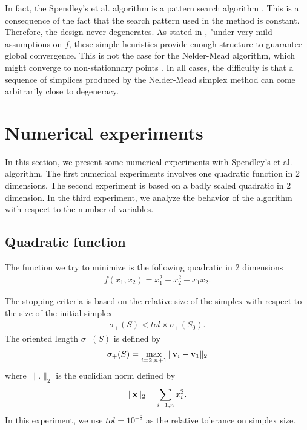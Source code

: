 In fact, the Spendley's et al. algorithm is a pattern search 
algorithm \cite{Torczon98fromevolutionary}. This is a consequence 
of the fact that the search pattern used in the method is constant.
Therefore, the design never degenerates. 
As stated in \cite{Torczon98fromevolutionary}, "under very mild 
assumptions on $f$, these simple heuristics 
provide enough structure to guarantee global convergence.
This is not the case for the Nelder-Mead algorithm, which might
converge to non-stationnary points \cite{589109, hanNeumann2003, Han2000, Torczon89multi-directionalsearch}. 
In all cases, the difficulty is that a sequence of simplices produced
by the Nelder-Mead simplex method can come arbitrarily close to 
degeneracy.

\section{Numerical experiments}

In this section, we present some numerical experiments 
with Spendley's et al. algorithm.
The first numerical experiments involves one quadratic function
in 2 dimensions. The second experiment is based on a 
badly scaled quadratic in 2 dimension. In the third experiment,
we analyze the behavior of the algorithm with respect to the 
number of variables.

\subsection{Quadratic function}

The function we try to minimize is the following quadratic 
in 2 dimensions 
\begin{eqnarray}
f(x_1,x_2) = x_1^2 + x_2^2 - x_1 x_2.
\end{eqnarray}

The stopping criteria is based on the relative size of the simplex 
with respect to the size of the initial simplex 
\begin{eqnarray}
\sigma_+(S) < tol \times \sigma_+(S_0).
\end{eqnarray}
The oriented length $\sigma_+(S)$ is defined by
\begin{eqnarray}
\sigma_+(S) = \max_{i=2,n+1} \|\mathbf{v}_i - \mathbf{v}_1\|_2
\end{eqnarray}
where $\|.\|_2$ is the euclidian norm defined by 
\begin{eqnarray}
\|\mathbf{x}\|_2 = \sum_{i=1,n}x_i^2.
\end{eqnarray}
In this experiment, we use $tol=10^{-8}$ as the relative tolerance 
on simplex size.

